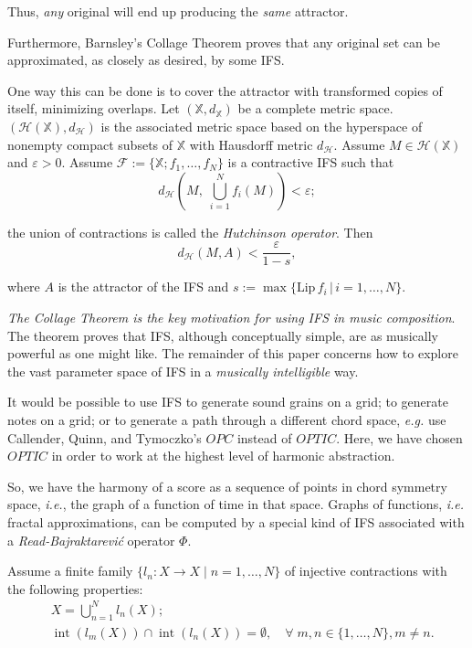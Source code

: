 \documentclass[english,11pt,letterpaper,onecolumn]{scrartcl}
\numberwithin{equation}{section}
\newcommand{\st}{\,|\,}
\newcommand{\X}{\mathbb{X}}
\newcommand{\cF}{\mathcal{F}}
\newcommand{\calH}{\mathcal{H}}
\newcommand{\Int}{\mathop{\mathrm{int}}}
\newcommand{\be}{\begin{equation}}
\newcommand{\ee}{\end{equation}}
\begin{document}
\noindent Thus, \textit{any} original will end up producing the
\textit{same} attractor.

Furthermore, Barnsley's Collage Theorem \cite{barnsley:1986:solution} proves
that any original set can be approximated, as closely as desired, by some IFS.

One way this can be done is to cover the attractor with transformed copies of
itself, minimizing overlaps. Let $(\mathbb{X},d_\mathbb{X})$ be a complete
metric space. $(\calH (\X), d_\calH)$ is the associated metric space based on
the hyperspace of nonempty compact subsets of $\X$ with Hausdorff metric
$d_\calH$. Assume $M\in\calH(\X)$ and $\varepsilon > 0$. Assume $\cF := \{\X;
f_1, \ldots, f_N\}$ is a contractive IFS such that
\be\label{hutchop}
d_\calH \left(M, \;\bigcup_{i=1}^N f_i (M) \right) < \varepsilon;
\ee

\noindent the union of contractions is called the \textit{Hutchinson operator}.
Then
\be
d_\calH (M, A) < \frac{\varepsilon}{1-s},
\ee

\noindent where $A$ is the attractor of the IFS and $s :=
\max\{\mathrm{Lip}\,f_i\st
i = 1, \ldots, N\}$.

\textit{The Collage Theorem is the key motivation for using IFS in music
composition}. The theorem proves that IFS, although conceptually simple, are as
musically powerful as one might like. The remainder of this paper concerns how
to explore the vast parameter space of IFS in a \textit{musically intelligible}
way.

It would be possible to use IFS to generate sound grains on a grid; to generate
notes on a grid; or to generate a path through a different chord space,
\textit{e.g.} use Callender, Quinn, and Tymoczko's $OPC$ instead of $OPTIC$.
Here, we have chosen $OPTIC$ in order to work at the highest level of harmonic
abstraction.

So, we have the harmony of a score as a sequence of points in chord symmetry
space, \textit{i.e.}, the graph of a function of time in that space. Graphs of
functions, \textit{i.e.} fractal approximations, can be computed by a special
kind of IFS associated with a \textit{Read-Bajraktarevi\'c} operator $\Phi$.

Assume a finite family $\{l_n : X\to X \mid n = 1, \ldots, N\}$ of injective
contractions with the following properties:
\begin{align}
&X = \bigcup_{n=1}^N l_n(X);\label{union}\\
&\Int (l_m(X))\cap \Int(l_n(X)) = \emptyset, \quad\forall\;m, n\in \{1,\ldots,
N\}, m\neq n.
\end{align}
\end{document}

